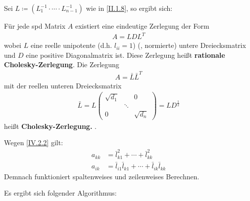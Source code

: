Sei $L\coloneqq (L_1^{-1}\cdot \cdots \cdot L_{n-1}^{-1})$ wie in \eqref{II.1.8}, so ergibt sich:



\begin{Fole}
  \label{4.2.2}
  Für jede spd Matrix $A$ existiert eine eindeutige Zerlegung der Form 
  \begin{gather*}
    A= LDL^T
  \end{gather*}
  wobei $L$ eine reelle unipotente (d.h. $l_{ii}=1$)  (, normierte)  untere 
  Dreiecksmatrix  und $D$ eine positive Diagonalmatrix ist. 
  Diese Zerlegung heißt \textbf{rationale Cholesky-Zerlegung}. Die Zerlegung
  \begin{gather}
    A= \bar{L}\bar{L}^T 
    \label{IV.2.2}
  \end{gather}
  mit der reellen unteren Dreiecksmatrix
  \begin{gather*}
    \bar{L} = L \begin{pmatrix}
      \sqrt{d_1} &&0 \\
      & \ddots & \\
      0&& \sqrt{d_n}
    \end{pmatrix} = LD^{\frac{1}{2}}
  \end{gather*}
  heißt \textbf{Cholesky-Zerlegung.} .
  
  Wegen \eqref{IV.2.2} gilt: 
  \begin{align}
    a_{kk} &= \bar{l}_{k1}^{2} + \cdots +  \bar{l}_{kk}^2  \label{IV.2.3} \\
    a_{ik} &= \bar{l}_{i1} \bar{l}_{k1} + \cdots + \bar{l}_{ik} \bar{l}_{kk}  \label{IV.2.4}
  \end{align}
  Demnach funktioniert spaltenweises und zeilenweises Berechnen. 
  
  \begin{image}{}
  \end{image}{}
\end{Fole}

Es ergibt sich folgender Algorithmus:


